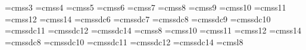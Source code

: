 \newcount\tabinstrument
\def\settab#1{%
  \tabinstrument=#1%
  \setlines#1 6%
  \setclefsymbol#1\tabclef%
}
\font\tabfntiii=cmss3
\font\tabfntiv=cmss4
\font\tabfntv=cmss5
\font\tabfntvi=cmss6
\font\tabfntvii=cmss7
\font\tabfntviii=cmss8
\font\tabfntix=cmss9
\font\tabfntx=cmss10
\font\tabfntxi=cmss11
\font\tabfntxii=cmss12
\font\tabfntxiv=cmss14
%
\font\tabbfntvi=cmssdc6
\font\tabbfntvii=cmssdc7
\font\tabbfntviii=cmssdc8
\font\tabbfntix=cmssdc9
\font\tabbfntx=cmssdc10
\font\tabbfntxi=cmssdc11
\font\tabbfntxii=cmssdc12
\font\tabbfntxiv=cmssdc14
%
\font\tablrfntviii=cmss8
\font\tablrfntx=cmss10
\font\tablrfntxi=cmss11
\font\tablrfntxii=cmss12
\font\tablrfntxiv=cmss14
%
\font\tabbbfntviii=cmssdc8
\font\tabbbfntx=cmssdc10
\font\tabbbfntxi=cmssdc11
\font\tabbbfntxii=cmssdc12
\font\tabbbfntxiv=cmssdc14
%
\font\disclaimerfont=cmsl8
\let\mymetertinyfont\eightbf
\def\Largetabsize{%
  \setsize1{1.44} %
  \let\tabmeterfnt\meterlargefont
  \let\tabcleffnt\tabbfntxiv
  \let\tabfnt\tabfntx
  \let\tabbfnt\tabbfntx
  \let\tablrfnt\tablrfntx
  \let\tabbbfnt\tabbbfntx
  \let\chordfnt\tabfntxii
  \let\chordbfnt\tabbfntxii
  \let\stringfnt\tabfntix
}
\def\largetabsize{%
  \setsize1{1.2} %
  \let\tabmeterfnt\meterbigfont
  \let\tabcleffnt\tabbfntxii
  \let\tabfnt\tabfntix
  \let\tabbfnt\tabbfntix
  \let\tablrfnt\tablrfntix
  \let\tabbbfnt\tabbbfntix
  \let\chordfnt\tabfntxi
  \let\chordbfnt\tabbfntxi
  \let\stringfnt\tabfntviii
}
\def\normaltabsize{%
  \setsize1{1} %
  \let\tabmeterfnt\meternorfont
  \let\tabcleffnt\tabbfntx
  \let\tabfnt\tabfntvii
  \let\tabbfnt\tabbfntvii
  \let\tablrfnt\tablrfntvii
  \let\tabbbfnt\tabbbfntvii
  \let\tabbbfnt\tabbbfntvii
  \let\chordfnt\tabfntx
  \let\chordbfnt\tabbfntx
  \let\stringfnt\tabfntvi
}
\def\smalltabsize{%
  \setsize1{.8} %
  \let\tabmeterfnt\metersmallfont
  \let\tabcleffnt\tabbfntviii
  \let\tabfnt\tabfntvi
  \let\tabbfnt\tabbfntvi
  \let\tablrfnt\tablrfntvi
  \let\tabbbfnt\tabbbfntvi
  \let\tabbbfnt\tabbbfntvi
  \let\chordfnt\tabfntviii
  \let\chordbfnt\tabbfntviii
  \let\stringfnt\tabfntv
}
\largetabsize
